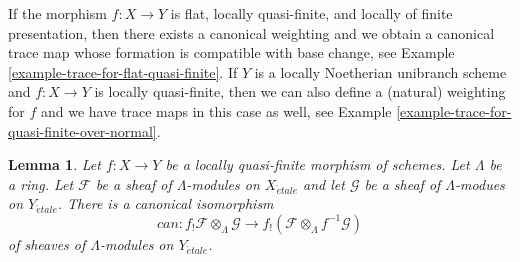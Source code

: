 \documentclass{stacks-project}
\theoremstyle{plain}
\newtheorem{lemma}[subsection]{Lemma}
\theoremstyle{definition}
\theoremstyle{remark}
\numberwithin{equation}{subsection}
\def\etale{{\acute{e}tale}}
\begin{document}
\medskip\noindent
If the morphism $f : X \to Y$ is flat, locally quasi-finite, and locally of
finite presentation, then there exists a canonical weighting
and we obtain a canonical trace map whose formation is
compatible with base change, see
Example \ref{example-trace-for-flat-quasi-finite}.
If $Y$ is a locally Noetherian unibranch scheme and $f : X \to Y$
is locally quasi-finite, then we can also define a (natural)
weighting for $f$ and we have trace maps in this case as well, see
Example \ref{example-trace-for-quasi-finite-over-normal}.

\begin{lemma}
\label{lemma-f-shriek-projection}
Let $f : X \to Y$ be a locally quasi-finite morphism of schemes.
Let $\Lambda$ be a ring.
Let $\mathcal{F}$ be a sheaf of $\Lambda$-modules on $X_\etale$
and let $\mathcal{G}$ be a sheaf of $\Lambda$-modues on $Y_\etale$.
There is a canonical isomorphism
$$
can :
f_!\mathcal{F} \otimes_\Lambda \mathcal{G}
\longrightarrow
f_!(\mathcal{F} \otimes_\Lambda f^{-1}\mathcal{G})
$$
of sheaves of $\Lambda$-modules on $Y_\etale$.
\end{lemma}
\end{document}
